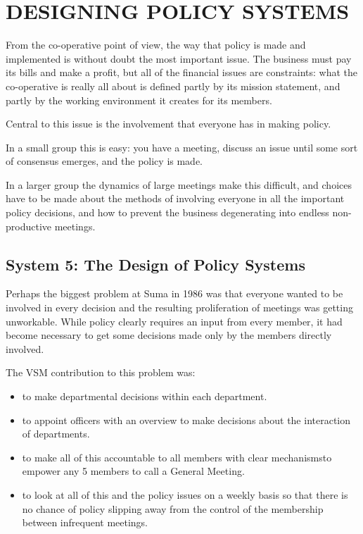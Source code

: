 \chapter{DESIGNING POLICY SYSTEMS}
  \label{DESIGNING POLICY SYSTEMS}
From the co-operative point of view, the way that policy is made and implemented is without doubt the most important issue. The business must pay its bills and make a profit, but all of the financial issues are constraints: what the co-operative is really all about is defined partly by its mission statement, and partly by the working environment it creates for its members.

Central to this issue is the involvement that everyone has in making policy.

In a small group this is easy: you have a meeting, discuss an issue until some sort of consensus emerges, and the policy is made.

In a larger group the dynamics of large meetings make this difficult, and choices have to be made about the methods of involving everyone in all the important policy decisions, and how to prevent the business degenerating into endless non-productive meetings.

\section*{System 5: The Design of Policy Systems}
Perhaps the biggest problem at Suma in 1986 was that everyone wanted to be involved in every decision and the resulting proliferation of meetings was getting unworkable. While policy clearly requires an input from every member, it had become necessary to get some decisions made only by the members directly involved.

The VSM contribution to this problem was:

\begin{itemize}
  \item to make departmental decisions within each department.

  \item to appoint officers with an overview to make decisions about the interaction of departments.

  \item to make all of this accountable to all members with clear mechanismsto empower any 5 members to call a General Meeting.

  \item to look at all of this and the policy issues on a weekly basis so that there is no chance of policy slipping away from the control of the membership between infrequent meetings.

\end{itemize}


